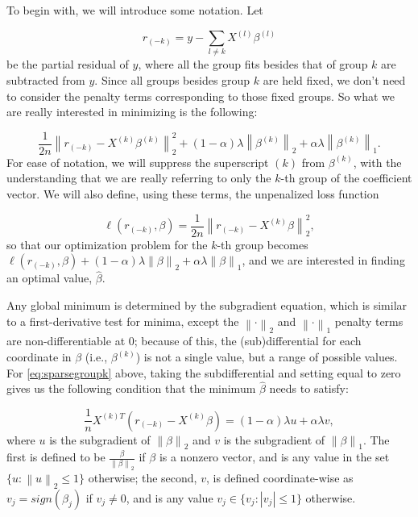 \documentclass[12pt]{article}
\newcommand{\norm}[1]{\left\lVert #1 \right\rVert}
\begin{document}
To begin with, we will introduce some notation. Let 

\[
r_{(-k)} = y - \sum_{l \neq k} X^{(l)} \beta^{(l)}
\]
be the partial residual of $y$, where all the group fits besides that of group $k$ are subtracted from $y$. Since all groups besides group $k$ are held fixed, we don't need to consider the penalty terms corresponding to those fixed groups. So what we are really interested in minimizing is the following:

\begin{equation}
	\label{eq:sparsegroupk}
\frac{1}{2n} \norm{r_{(-k)}-X^{(k)}\beta^{(k)}}_2^2 + (1-\alpha)\lambda \norm{\beta^{(k)}}_2 + \alpha \lambda \norm{\beta^{(k)}}_1. 
\end{equation}
For ease of notation, we will suppress the superscript $(k)$ from $\beta^{(k)}$, with the understanding that we are really referring to only the $k$-th group of the coefficient vector. We will also define, using these terms, the unpenalized loss function

\[
\ell (r_{(-k)}, \beta) = \frac{1}{2n}\norm{r_{(-k)} - X^{(k)}\beta}_2^2, 
\]
so that our optimization problem for the $k$-th group becomes $\ell (r_{(-k)},\beta) + (1-\alpha)\lambda\norm{\beta}_2 + \alpha \lambda \norm{\beta}_1$, and we are interested in finding an optimal value, $\hat{\beta}$.

Any global minimum is determined by the subgradient equation, which is similar to a first-derivative test for minima, except the $\norm{\cdot}_2$ and $\norm{\cdot}_1$ penalty terms are non-differentiable at $0$; because of this, the (sub)differential for each coordinate in $\beta$ (i.e., $\beta^{(k)}$) is not a single value, but a range of possible values. For \autoref{eq:sparsegroupk} above, taking the subdifferential and setting equal to zero gives us the following condition that the minimum $\hat{\beta}$ needs to satisfy: 

\begin{equation}
  \label{eq:subgrad}
\frac{1}{n}X^{(k)T}(r_{(-k)} - X^{(k)}\beta) = (1-\alpha)\lambda u + \alpha \lambda v,
\end{equation}
where $u$ is the subgradient of $\norm{\beta}_2$ and $v$ is the subgradient of $\norm{\beta}_1$. The first is defined to be $\frac{\beta}{\norm{\beta}_2}$ if $\beta$ is a nonzero vector, and is any value in the set $\{ u : \norm{u}_2 \leq 1 \}$ otherwise; the second, $v$, is defined coordinate-wise as $v_j = sign(\beta_j)$ if $v_j \neq 0$, and is any value $v_j \in \{v_j : |v_j| \leq 1 \}$ otherwise.
\end{document}
